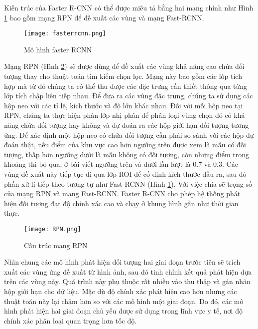 \documentclass[../the.tex]{subfiles}
\begin{document}
\bigskip

{\fontsize{13}{12} \selectfont
	Kiến trúc của Faster R-CNN có thể được miêu tả bằng hai mạng chính như Hình \ref{fig:fasterrcnn} bao gồm mạng RPN để đề xuất các vùng và mạng Fast-RCNN.

}
\begin{figure}[H]
	\centering
	\texttt{[image: fasterrcnn.png]}
	\caption{Mô hình faster RCNN \cite{ren2016faster}}
	\label{fig:fasterrcnn}
\end{figure}

{\fontsize{13}{12} \selectfont
Mạng RPN (Hình \ref{fig:rpn}) sẽ được dùng để đề xuất các vùng khả năng cao chứa đối tượng thay cho thuật toán tìm kiếm chọn lọc.
Mạng này bao gồm các lớp tích hợp mà từ đó chúng ta có thể thu được các đặc trưng cần thiết thông qua từng lớp tích chập liên tiếp nhau.
Để đưa ra các vùng đặc trưng, chúng ta sử dụng các hộp neo với các tỉ lệ, kích thước và độ lớn khác nhau. Đối với mỗi hộp neo tại RPN, chúng ta thực hiện phân lớp nhị phân để phân loại vùng chọn đó có khả năng chứa đối tượng hay không và dự đoán ra các hộp giới hạn đối tượng tương ứng.
Để xác định một hộp neo có chứa đối tượng cần phải so sánh với các hộp dự đoán thật, nếu điểm của khu vực cao hơn ngưỡng trên được xem là mẫu có đối tượng, thấp hơn ngưỡng dưới là mẫu không có đối tượng, còn những điểm trong khoảng thì bỏ qua, ở bài viết ngưỡng trên và dưới lần lượt là 0.7 và 0.3.
Các vùng đề xuất này tiếp tục đi qua lớp ROI để cố định kích thước đầu ra, sau đó phần xử lí tiếp theo tương tự như Fast-RCNN (Hình \ref{fig:fasterrcnn}).
Với việc chia sẽ trọng số của mạng RPN và mạng Fast-RCNN. Faster R-CNN cho phép hệ thống phát hiện đối tượng đạt độ chính xác cao và chạy ở khung hình gần như thời gian thực.
}

\begin{figure}[H]
	\centering
	\texttt{[image: RPN.png]}
	\caption{Cấu trúc mạng RPN}
	\label{fig:rpn}
\end{figure}

{\fontsize{13}{12} \selectfont
Nhìn chung các mô hình phát hiện đối tượng hai giai đoạn
trước tiên sẽ trích xuất các vùng ứng đề xuất từ hình ảnh, sau đó tinh chỉnh kết quả phát hiện dựa trên các vùng này. Quá trình này phụ thuộc rất nhiều vào thu thập và gán nhãn hộp giới hạn cho dữ liệu.
Mặc dù độ chính xác phát hiện cao hơn nhưng các thuật toán này lại chậm hơn so với các mô hình một giai đoạn.
Do đó, các mô hình phát hiện hai giai đoạn chủ yếu được sử dụng trong lĩnh vực y tế, nơi độ chính xác phân loại quan trọng hơn tốc độ.
}
\end{document}
